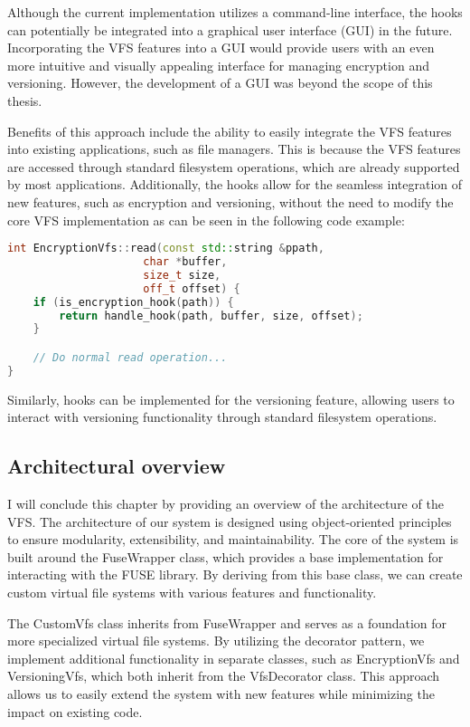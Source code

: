 Although the current implementation utilizes a command-line interface, the hooks can potentially be integrated into a graphical user interface (GUI) in the future.
Incorporating the VFS features into a GUI would provide users with an even more intuitive and visually appealing interface for managing encryption and versioning.
However, the development of a GUI was beyond the scope of this thesis.

Benefits of this approach include the ability to easily integrate the VFS features into existing applications, such as file managers.
This is because the VFS features are accessed through standard filesystem operations, which are already supported by most applications.
Additionally, the hooks allow for the seamless integration of new features, such as encryption and versioning, without the need to modify the core VFS implementation as can be seen in the following code example:

\begin{lstlisting}[language=c++, basicstyle=\ttfamily\small]
int EncryptionVfs::read(const std::string &ppath,
                     char *buffer,
                     size_t size,
                     off_t offset) {
    if (is_encryption_hook(path)) {
        return handle_hook(path, buffer, size, offset);
    }

    // Do normal read operation...
}
\end{lstlisting}

Similarly, hooks can be implemented for the versioning feature, allowing users to interact with versioning functionality through standard filesystem operations.

\subsection{Architectural overview}\label{subsec:overview}

I will conclude this chapter by providing an overview of the architecture of the VFS\@.
The architecture of our system is designed using object-oriented principles to ensure modularity, extensibility, and maintainability.
The core of the system is built around the FuseWrapper class, which provides a base implementation for interacting with the FUSE library.
By deriving from this base class, we can create custom virtual file systems with various features and functionality.

The CustomVfs class inherits from FuseWrapper and serves as a foundation for more specialized virtual file systems.
By utilizing the decorator pattern, we implement additional functionality in separate classes, such as EncryptionVfs and VersioningVfs, which both inherit from the VfsDecorator class.
This approach allows us to easily extend the system with new features while minimizing the impact on existing code.

